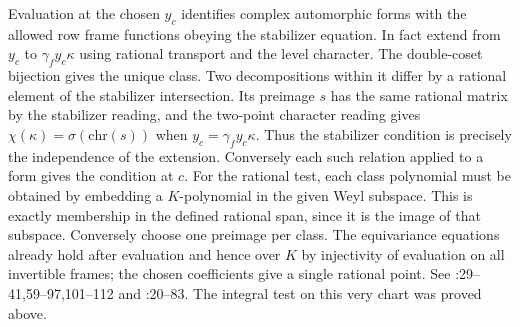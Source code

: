 Evaluation at the chosen $y_c$ identifies complex automorphic forms
with the allowed row frame functions obeying the stabilizer equation.
In fact extend from $y_c$ to $\gamma_f y_c\kappa$ using rational
transport and the level character. The double-coset bijection gives
the unique class. Two decompositions within it differ by a rational
element of the stabilizer intersection. Its preimage $s$ has the same
rational matrix by the stabilizer reading, and the two-point character
reading gives $\chi(\kappa)=\sigma(\mathrm{chr}(s))$ when
$y_c=\gamma_f y_c\kappa$. Thus the stabilizer condition is precisely
the independence of the extension. Conversely each such relation applied
to a form gives the condition at $c$. For the rational test, each
class polynomial must be obtained by embedding a $K$-polynomial in the
given Weyl subspace. This is exactly membership in the defined rational
span, since it is the image of that subspace. Conversely choose one
preimage per class. The equivariance equations already hold after
evaluation and hence over $K$ by injectivity of evaluation on all
invertible frames; the chosen coefficients give a single rational point.
See :29--41,59--97,101--112 and
:20--83.
The integral test on this very chart was proved above.

